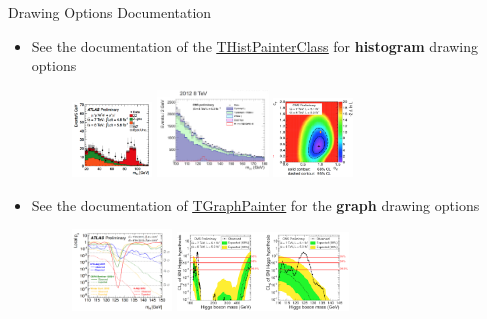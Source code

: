 \documentclass[aspectratio=169]{beamer}
\newcommand{\myhref}[2]{{\color{blue}\href{#1}{\underline{#2}}}}
\begin{document}
\begin{frame}[fragile]{Drawing Options Documentation}
\begin{itemize}
    \item See the documentation of the \myhref{https://root.cern/doc/master/classTHistPainter.html}{THistPainterClass} for \textbf{histogram} drawing options
    \begin{figure}
        \includegraphics[width=0.2\textwidth]{hist-painter-1.png}
        \includegraphics[width=0.28\textwidth]{hist-painter-2.png}
        \includegraphics[width=0.2\textwidth]{hist-painter-3.png}
    \end{figure}
\item See the documentation of \myhref{https://root.cern/doc/master/classTGraphPainter.html}{TGraphPainter} for the \textbf{graph} drawing options
    \begin{figure}
        \includegraphics[width=0.25\textwidth]{graph-painter-1.png}
        \includegraphics[width=0.43\textwidth]{graph-painter-2.png}
    \end{figure}
\end{itemize}
\end{frame}
\end{document}
